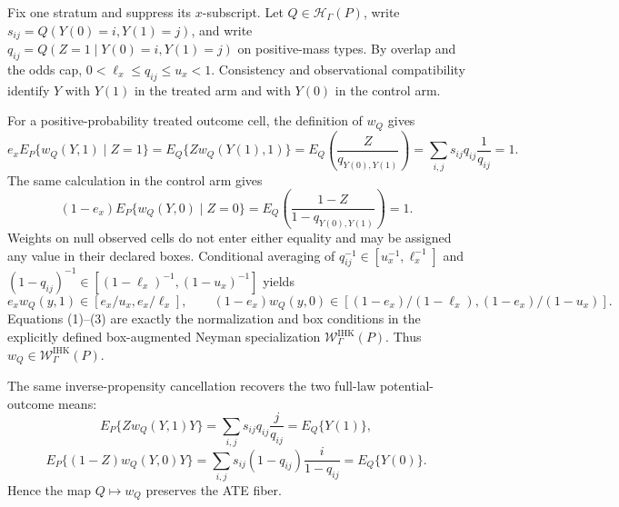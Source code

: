 Fix one stratum and suppress its \(x\)-subscript.  Let \(Q\in\mathcal H_\Gamma(P)\), write \(s_{ij}=Q(Y(0)=i,Y(1)=j)\), and write \(q_{ij}=Q(Z=1\mid Y(0)=i,Y(1)=j)\) on positive-mass types.  By overlap and the odds cap, \(0<\ell_x\leq q_{ij}\leq u_x<1\).  Consistency and observational compatibility identify \(Y\) with \(Y(1)\) in the treated arm and with \(Y(0)\) in the control arm.

For a positive-probability treated outcome cell, the definition of \(w_Q\) gives
\[
 e_x E_P\{w_Q(Y,1)\mid Z=1\}
 =E_Q\{Z w_Q(Y(1),1)\}
 =E_Q\!\left(\frac{Z}{q_{Y(0),Y(1)}}\right)
 =\sum_{i,j}s_{ij}q_{ij}\frac{1}{q_{ij}}=1. \tag{1}
\]
The same calculation in the control arm gives
\[
 (1-e_x)E_P\{w_Q(Y,0)\mid Z=0\}
 =E_Q\!\left(\frac{1-Z}{1-q_{Y(0),Y(1)}}\right)=1. \tag{2}
\]
Weights on null observed cells do not enter either equality and may be assigned any value in their declared boxes.  Conditional averaging of \(q_{ij}^{-1}\in[u_x^{-1},\ell_x^{-1}]\) and \((1-q_{ij})^{-1}\in[(1-\ell_x)^{-1},(1-u_x)^{-1}]\) yields
\[
 e_xw_Q(y,1)\in[e_x/u_x,e_x/\ell_x],\qquad
 (1-e_x)w_Q(y,0)\in[(1-e_x)/(1-\ell_x),(1-e_x)/(1-u_x)]. \tag{3}
\]
Equations (1)--(3) are exactly the normalization and box conditions in the explicitly defined box-augmented Neyman specialization \(\mathcal W^{\mathrm{IHK}}_\Gamma(P)\).  Thus \(w_Q\in\mathcal W^{\mathrm{IHK}}_\Gamma(P)\).

The same inverse-propensity cancellation recovers the two full-law potential-outcome means:
\[
 E_P\{Zw_Q(Y,1)Y\}
 =\sum_{i,j}s_{ij}q_{ij}\frac{j}{q_{ij}}
 =E_Q\{Y(1)\}, \tag{4}
\]
\[
 E_P\{(1-Z)w_Q(Y,0)Y\}
 =\sum_{i,j}s_{ij}(1-q_{ij})\frac{i}{1-q_{ij}}
 =E_Q\{Y(0)\}. \tag{5}
\]
Hence the map \(Q\mapsto w_Q\) preserves the ATE fiber.

